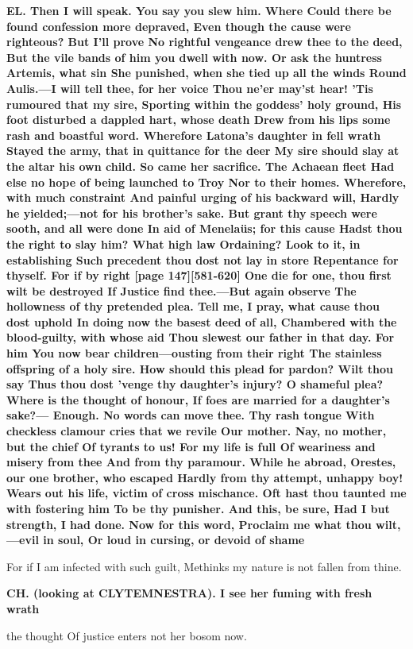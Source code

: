\documentclass[11pt,letter]{book}
\begin{document}
\par \textbf{EL. Then I will speak. You say you slew him. Where Could there be found confession more depraved, Even though the cause were righteous? But I’ll prove No rightful vengeance drew thee to the deed, But the vile bands of him you dwell with now. Or ask the huntress Artemis, what sin She punished, when she tied up all the winds Round Aulis.—I will tell thee, for her voice Thou ne’er may’st hear! ’Tis rumoured that my sire, Sporting within the goddess’ holy ground, His foot disturbed a dappled hart, whose death Drew from his lips some rash and boastful word. Wherefore Latona’s daughter in fell wrath Stayed the army, that in quittance for the deer My sire should slay at the altar his own child. So came her sacrifice. The Achaean fleet Had else no hope of being launched to Troy Nor to their homes. Wherefore, with much constraint And painful urging of his backward will, Hardly he yielded;—not for his brother’s sake. But grant thy speech were sooth, and all were done In aid of Menelaüs; for this cause Hadst thou the right to slay him? What high law Ordaining? Look to it, in establishing Such precedent thou dost not lay in store Repentance for thyself. For if by right [page 147][581-620] One die for one, thou first wilt be destroyed If Justice find thee.—But again observe The hollowness of thy pretended plea. Tell me, I pray, what cause thou dost uphold In doing now the basest deed of all, Chambered with the blood-guilty, with whose aid Thou slewest our father in that day. For him You now bear children—ousting from their right The stainless offspring of a holy sire. How should this plead for pardon? Wilt thou say Thus thou dost ’venge thy daughter’s injury? O shameful plea? Where is the thought of honour, If foes are married for a daughter’s sake?— Enough. No words can move thee. Thy rash tongue With checkless clamour cries that we revile Our mother. Nay, no mother, but the chief Of tyrants to us! For my life is full Of weariness and misery from thee And from thy paramour. While he abroad, Orestes, our one brother, who escaped Hardly from thy attempt, unhappy boy! Wears out his life, victim of cross mischance. Oft hast thou taunted me with fostering him To be thy punisher. And this, be sure, Had I but strength, I had done. Now for this word, Proclaim me what thou wilt,—evil in soul, Or loud in cursing, or devoid of shame}
\par   For if I am infected with such guilt, Methinks my nature is not fallen from thine.

\par \textbf{CH. (looking at CLYTEMNESTRA). I see her fuming with fresh wrath}
\par   the thought Of justice enters not her bosom now.
\end{document}
